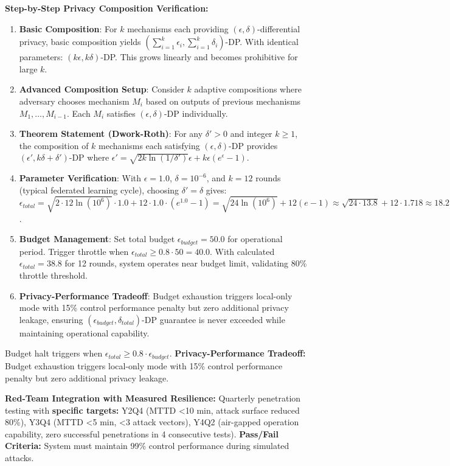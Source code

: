 \documentclass[12pt]{article}
\begin{document}
\textbf{Step-by-Step Privacy Composition Verification:}
\begin{enumerate}
\item \textbf{Basic Composition}: For $k$ mechanisms each providing $(\epsilon, \delta)$-differential privacy, basic composition yields $(\sum_{i=1}^k \epsilon_i, \sum_{i=1}^k \delta_i)$-DP. With identical parameters: $(k\epsilon, k\delta)$-DP. This grows linearly and becomes prohibitive for large $k$.
\item \textbf{Advanced Composition Setup}: Consider $k$ adaptive compositions where adversary chooses mechanism $M_i$ based on outputs of previous mechanisms $M_1, \ldots, M_{i-1}$. Each $M_i$ satisfies $(\epsilon, \delta)$-DP individually.
\item \textbf{Theorem Statement (Dwork-Roth)}: For any $\delta' > 0$ and integer $k \geq 1$, the composition of $k$ mechanisms each satisfying $(\epsilon, \delta)$-DP provides $(\epsilon', k\delta + \delta')$-DP where $\epsilon' = \sqrt{2k\ln(1/\delta')}\epsilon + k\epsilon(e^\epsilon - 1)$.
\item \textbf{Parameter Verification}: With $\epsilon = 1.0$, $\delta = 10^{-6}$, and $k = 12$ rounds (typical federated learning cycle), choosing $\delta' = \delta$ gives: $\epsilon_{total} = \sqrt{2 \cdot 12 \ln(10^6)} \cdot 1.0 + 12 \cdot 1.0 \cdot (e^{1.0} - 1) = \sqrt{24 \ln(10^6)} + 12(e-1) \approx \sqrt{24 \cdot 13.8} + 12 \cdot 1.718 \approx 18.2 + 20.6 = 38.8$.
\item \textbf{Budget Management}: Set total budget $\epsilon_{budget} = 50.0$ for operational period. Trigger throttle when $\epsilon_{total} \geq 0.8 \cdot 50 = 40.0$. With calculated $\epsilon_{total} = 38.8$ for 12 rounds, system operates near budget limit, validating 80\% throttle threshold.
\item \textbf{Privacy-Performance Tradeoff}: Budget exhaustion triggers local-only mode with 15\% control performance penalty but zero additional privacy leakage, ensuring $(\epsilon_{budget}, \delta_{total})$-DP guarantee is never exceeded while maintaining operational capability.
\end{enumerate}

Budget halt triggers when $\epsilon_{total} \geq 0.8 \cdot \epsilon_{budget}$. \textbf{Privacy-Performance Tradeoff:} Budget exhaustion triggers local-only mode with 15\% control performance penalty but zero additional privacy leakage.

\textbf{Red-Team Integration with Measured Resilience:} Quarterly penetration testing with \textbf{specific targets:} Y2Q4 (MTTD <10 min, attack surface reduced 80\%), Y3Q4 (MTTD <5 min, <3 attack vectors), Y4Q2 (air-gapped operation capability, zero successful penetrations in 4 consecutive tests). \textbf{Pass/Fail Criteria:} System must maintain 99\% control performance during simulated attacks.
\end{document}
